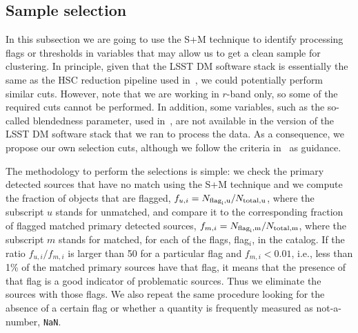\documentclass[\docopts]{\docclass}
\begin{document}
\subsection{Sample selection}
\label{ssec:sample_selection}

In this subsection we are going to use the \textsf{S+M} technique to identify processing flags or thresholds in variables that may allow us to get a clean sample for clustering. In principle, given that the LSST DM software stack is essentially the same as the HSC reduction pipeline used in~\citet{2018PASJ...70S..25M}, we could potentially perform similar cuts. However, note that we are working in $r$-band only, so some of the required cuts cannot be performed. In addition, some variables, such as the so-called blendedness parameter, used in~\citet{2018PASJ...70S..25M}, are not available in the version of the LSST DM software stack that we ran to process the data. As a consequence, we propose our own selection cuts, although we follow the criteria in~\citet{2018PASJ...70S..25M} as guidance.


The methodology to perform the selections is simple: we check the primary detected sources that have no match using the \textsf{S+M} technique and we compute the fraction of objects that are flagged, $f_{u,i} = N_{\rm{flag}_{i}, u}/N_{\rm{total}, u}$, where the subscript $u$ stands for unmatched, and compare it to the corresponding fraction of flagged matched primary detected sources, $f_{m,i} = N_{\rm{flag}_{i}, m}/N_{\rm{total}, m}$, where the subscript $m$ stands for matched, for each of the flags, flag$_{i}$, in the catalog. If the ratio $f_{u,i}/f_{m,i}$ is larger than 50 for a particular flag and $f_{m,i} < 0.01$, i.e., less than 1\% of the matched primary sources have that flag, it means that the presence of that flag is a good indicator of problematic sources. Thus we eliminate the sources with those flags. We also repeat the same procedure looking for the absence of a certain flag or whether a quantity is frequently measured as not-a-number, \texttt{NaN}. 


\end{document}
